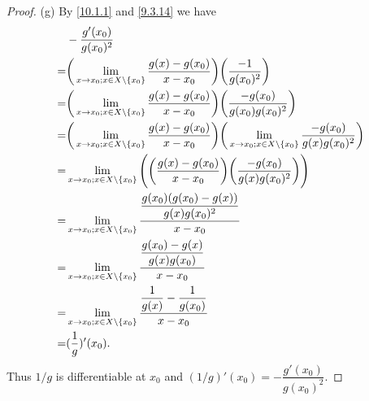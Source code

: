 \begin{proof}{(g)}
  By \cref{10.1.1} and \cref{9.3.14} we have
  \begin{align*}
      & -\dfrac{g'(x_0)}{g(x_0)^2}                                                                                                                                                          \\
    = & \bigg(\lim_{x \to x_0 ; x \in X \setminus \left\lbrace x_0\right\rbrace} \dfrac{g(x) - g(x_0)}{x - x_0}\bigg) \bigg(\dfrac{-1}{g(x_0)^2}\bigg)                                                          \\
    = & \bigg(\lim_{x \to x_0 ; x \in X \setminus \left\lbrace x_0\right\rbrace} \dfrac{g(x) - g(x_0)}{x - x_0}\bigg) \bigg(\dfrac{-g(x_0)}{g(x_0) g(x_0)^2}\bigg)                                              \\
    = & \bigg(\lim_{x \to x_0 ; x \in X \setminus \left\lbrace x_0\right\rbrace} \dfrac{g(x) - g(x_0)}{x - x_0}\bigg) \bigg(\lim_{x \to x_0 ; x \in X \setminus \left\lbrace x_0\right\rbrace} \dfrac{-g(x_0)}{g(x) g(x_0)^2}\bigg) \\
    = & \lim_{x \to x_0 ; x \in X \setminus \left\lbrace x_0\right\rbrace} \Bigg(\bigg(\dfrac{g(x) - g(x_0)}{x - x_0}\bigg) \bigg(\dfrac{-g(x_0)}{g(x) g(x_0)^2}\bigg)\Bigg)                                    \\
    = & \lim_{x \to x_0 ; x \in X \setminus \left\lbrace x_0\right\rbrace} \dfrac{\dfrac{g(x_0)(g(x_0) - g(x))}{g(x) g(x_0)^2}}{x - x_0}                                                                        \\
    = & \lim_{x \to x_0 ; x \in X \setminus \left\lbrace x_0\right\rbrace} \dfrac{\dfrac{g(x_0) - g(x)}{g(x) g(x_0)}}{x - x_0}                                                                                  \\
    = & \lim_{x \to x_0 ; x \in X \setminus \left\lbrace x_0\right\rbrace} \dfrac{\dfrac{1}{g(x)} - \dfrac{1}{g(x_0)}}{x - x_0}                                                                                 \\
    = & (\dfrac{1}{g})'(x_0).
  \end{align*}
  Thus \(1 / g\) is differentiable at \(x_0\) and \((1 / g)'(x_0) = -\dfrac{g'(x_0)}{g(x_0)^2}\).
\end{proof}

